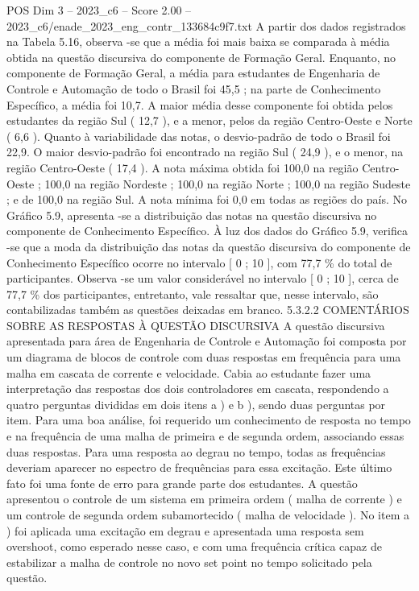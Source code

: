 \begin{textsample}{POS Dim 3 – 2023\_c6 – Score 2.00 – 2023\_c6/enade\_2023\_eng\_contr\_133684c9f7.txt}
A partir dos dados registrados na Tabela 5.16, observa -se que a média foi mais baixa se comparada à média obtida na questão discursiva do componente de Formação Geral.
Enquanto, no componente de Formação Geral, a média para estudantes de Engenharia de Controle e Automação de todo o Brasil foi 45,5 ; na parte de Conhecimento Específico, a média foi 10,7.
A maior média desse componente foi obtida pelos estudantes da região Sul ( 12,7 ), e a menor, pelos da região Centro-Oeste e Norte ( 6,6 ).
Quanto à variabilidade das notas, o desvio-padrão de todo o Brasil foi 22,9.
O maior desvio-padrão foi encontrado na região Sul ( 24,9 ), e o menor, na região Centro-Oeste ( 17,4 ).
A nota máxima obtida foi 100,0 na região Centro-Oeste ; 100,0 na região Nordeste ; 100,0 na região Norte ; 100,0 na região Sudeste ; e de 100,0 na região Sul.
A nota mínima foi 0,0 em todas as regiões do país.
No Gráfico 5.9, apresenta -se a distribuição das notas na questão discursiva no componente de Conhecimento Específico.
À luz dos dados do Gráfico 5.9, verifica -se que a moda da distribuição das notas da questão discursiva do componente de Conhecimento Específico ocorre no intervalo [ 0 ; 10 ], com 77,7 \% do total de participantes.
Observa -se um valor considerável no intervalo [ 0 ; 10 ], cerca de 77,7 \% dos participantes, entretanto, vale ressaltar que, nesse intervalo, são contabilizadas também as questões deixadas em branco. 5.3.2.2 COMENTÁRIOS SOBRE AS RESPOSTAS À QUESTÃO DISCURSIVA A questão discursiva apresentada para área de Engenharia de Controle e Automação foi composta por um diagrama de blocos de controle com duas respostas em frequência para uma malha em cascata de corrente e velocidade.
Cabia ao estudante fazer uma interpretação das respostas dos dois controladores em cascata, respondendo a quatro perguntas divididas em dois itens a ) e b ), sendo duas perguntas por item.
Para uma boa análise, foi requerido um conhecimento de resposta no tempo e na frequência de uma malha de primeira e de segunda ordem, associando essas duas respostas.
Para uma resposta ao degrau no tempo, todas as frequências deveriam aparecer no espectro de frequências para essa excitação.
Este último fato foi uma fonte de erro para grande parte dos estudantes.
A questão apresentou o controle de um sistema em primeira ordem ( malha de corrente ) e um controle de segunda ordem subamortecido ( malha de velocidade ).
No item a ) foi aplicada uma excitação em degrau e apresentada uma resposta sem overshoot, como esperado nesse caso, e com uma frequência crítica capaz de estabilizar a malha de controle no novo set point no tempo solicitado pela questão.

\end{textsample}
